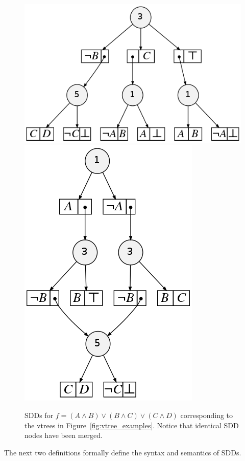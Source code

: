 \documentclass[11pt]{article}
\begin{document}
\begin{figure}
\centering
\includegraphics[scale=0.3]{balancedfirstexample.png}
\includegraphics[scale=0.3]{rightlinearfirstexample.png}

\caption{SDDs for $f = (A \land B) \lor (B \land C) \lor (C \land D)$ corresponding to the vtrees in Figure~\ref{fig:vtree_examples}. Notice that identical SDD nodes have been merged.}
\label{fig:sddexample1} 
\end{figure}

The next two definitions formally define the syntax and semantics of SDDs.
\end{document}
